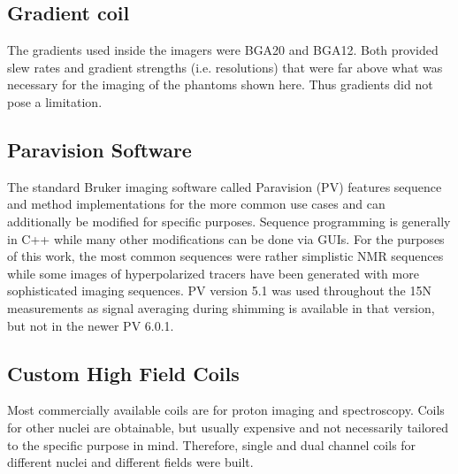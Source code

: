         \subsection{Gradient coil}
            The gradients used inside the imagers were BGA20 and BGA12. Both provided slew rates and gradient strengths (i.e. resolutions) that were far above what was necessary for the imaging of the phantoms shown here. Thus gradients did not pose a limitation.
        \subsection{Paravision Software}
        The standard Bruker imaging software called Paravision (PV) features sequence and method implementations for the more common use cases and can additionally be modified for specific purposes. Sequence programming is generally in C++ while many other modifications can be done via GUIs.  For the purposes of this work, the most common sequences were rather simplistic NMR sequences while some images of hyperpolarized tracers have been generated with more sophisticated imaging sequences. PV version 5.1 was used throughout the 15N measurements as signal averaging during shimming is available in that version, but not in the newer PV 6.0.1.
        \subsection{Custom High Field Coils}
            Most commercially available coils are for proton imaging and spectroscopy. Coils for other nuclei are obtainable, but usually expensive and not necessarily tailored to the specific purpose in mind. Therefore, single and dual channel coils for different nuclei and different fields were built.
